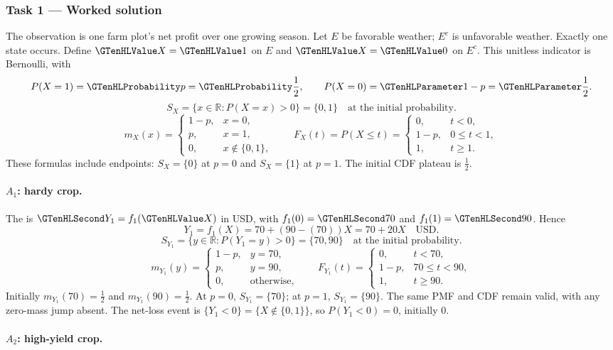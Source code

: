 \subsubsection*{Task 1 --- Worked solution}\label{sol:c3-agriculture-model}
The observation is one farm plot's net profit over one growing season. Let $E$ be favorable weather; $E^c$ is unfavorable weather. Exactly one state occurs. Define $\Indicator{X}=\Indicator{1}$ on $E$ and $\Indicator{X}=\Indicator{0}$ on $E^c$. This unitless indicator is Bernoulli, with
\[P(X=1)=\SuccessProb{p}=\SuccessProb{\frac{1}{2}},\qquad P(X=0)=\FailureProb{1-p}=\FailureProb{\frac{1}{2}}.\]
\[S_X=\{x\in\mathbb R:P(X=x)>0\}=\{0,1\}\quad\text{at the initial probability}.\]
\[m_X(x)=\begin{cases}1-p,&x=0,\\p,&x=1,\\0,&x\notin\{0,1\},\end{cases}\qquad F_X(t)=P(X\leq t)=\begin{cases}0,&t<0,\\1-p,&0\leq t<1,\\1,&t\geq1.\end{cases}\]
These formulas include endpoints: $S_X=\{0\}$ at $p=0$ and $S_X=\{1\}$ at $p=1$. The initial CDF plateau is $\frac{1}{2}$.
\paragraph{$A_1$: hardy crop.}
The  is $\Money{Y_1}=f_1(\Indicator{X})$ in USD, with $f_1(0)=\Money{70}$ and $f_1(1)=\Money{90}$. Hence
\[Y_1=f_1(X)=70+(90-(70))X=70+20X\quad\text{USD}.\]
\[S_{Y_1}=\{y\in\mathbb R:P(Y_1=y)>0\}=\{70,90\}\quad\text{at the initial probability}.\]
\[m_{Y_1}(y)=\begin{cases}1-p,&y=70,\\p,&y=90,\\0,&\text{otherwise},\end{cases}\qquad F_{Y_1}(t)=\begin{cases}0,&t<70,\\1-p,&70\leq t<90,\\1,&t\geq 90.\end{cases}\]
Initially $m_{Y_1}(70)=\frac{1}{2}$ and $m_{Y_1}(90)=\frac{1}{2}$. At $p=0$, $S_{Y_1}=\{70\}$; at $p=1$, $S_{Y_1}=\{90\}$. The same PMF and CDF remain valid, with any zero-mass jump absent.
The net-loss event is $\{Y_1<0\}=\{X\notin\{0,1\}\}$, so $P(Y_1<0)=0$, initially $0$.
\paragraph{$A_2$: high-yield crop.}

